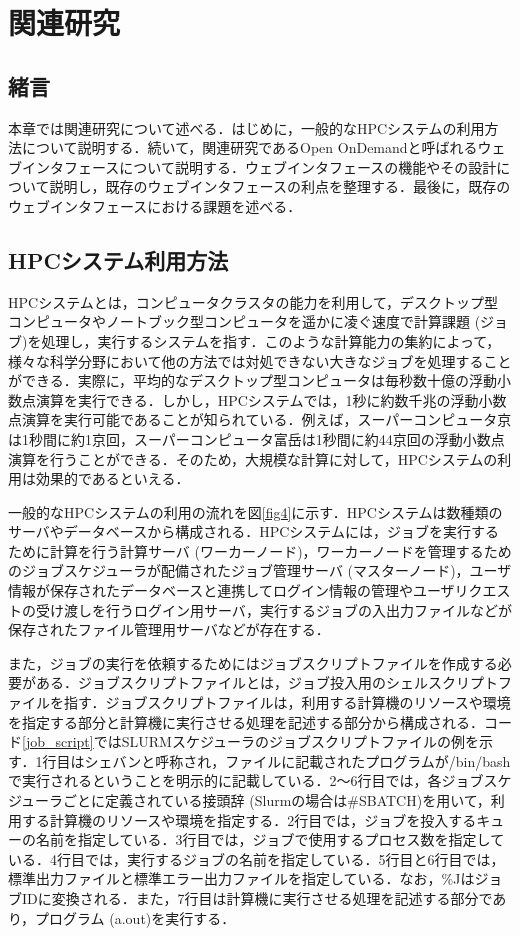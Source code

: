 
\section{関連研究}

\subsection{緒言}
本章では関連研究について述べる．はじめに，一般的なHPCシステムの利用方法について説明する．続いて，関連研究であるOpen OnDemandと呼ばれるウェブインタフェースについて説明する．ウェブインタフェースの機能やその設計について説明し，既存のウェブインタフェースの利点を整理する．最後に，既存のウェブインタフェースにおける課題を述べる．

\subsection{HPCシステム利用方法}
HPCシステムとは，コンピュータクラスタの能力を利用して，デスクトップ型コンピュータやノートブック型コンピュータを遥かに凌ぐ速度で計算課題 (ジョブ)を処理し，実行するシステムを指す．このような計算能力の集約によって，様々な科学分野において他の方法では対処できない大きなジョブを処理することができる．実際に，平均的なデスクトップ型コンピュータは毎秒数十億の浮動小数点演算を実行できる．しかし，HPCシステムでは，1秒に約数千兆の浮動小数点演算を実行可能であることが知られている．例えば，スーパーコンピュータ京は1秒間に約1京回，スーパーコンピュータ富岳は1秒間に約44京回の浮動小数点演算を行うことができる\cite{kei,hugaku}．そのため，大規模な計算に対して，HPCシステムの利用は効果的であるといえる．\par
一般的なHPCシステムの利用の流れを図\ref{fig4}に示す．HPCシステムは数種類のサーバやデータベースから構成される．HPCシステムには，ジョブを実行するために計算を行う計算サーバ (ワーカーノード)，ワーカーノードを管理するためのジョブスケジューラが配備されたジョブ管理サーバ (マスターノード)，ユーザ情報が保存されたデータベースと連携してログイン情報の管理やユーザリクエストの受け渡しを行うログイン用サーバ，実行するジョブの入出力ファイルなどが保存されたファイル管理用サーバなどが存在する．\par
また，ジョブの実行を依頼するためにはジョブスクリプトファイルを作成する必要がある．ジョブスクリプトファイルとは，ジョブ投入用のシェルスクリプトファイルを指す．ジョブスクリプトファイルは，利用する計算機のリソースや環境を指定する部分と計算機に実行させる処理を記述する部分から構成される．コード\ref{job_script}ではSLURMスケジューラのジョブスクリプトファイルの例を示す．1行目はシェバンと呼称され，ファイルに記載されたプログラムが/bin/bashで実行されるということを明示的に記載している．2～6行目では，各ジョブスケジューラごとに定義されている接頭辞 (Slurmの場合は\#SBATCH)を用いて，利用する計算機のリソースや環境を指定する．2行目では，ジョブを投入するキューの名前を指定している．3行目では，ジョブで使用するプロセス数を指定している．4行目では，実行するジョブの名前を指定している．5行目と6行目では，標準出力ファイルと標準エラー出力ファイルを指定している．なお，\%JはジョブIDに変換される．また，7行目は計算機に実行させる処理を記述する部分であり，プログラム (a.out)を実行する．\par
